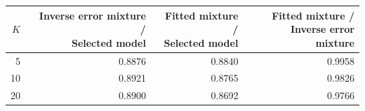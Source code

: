 \begin{tabular}{rrrr}
\toprule
$K$ & \shortstack[r]{Inverse error mixture /\\Selected model} & \shortstack[r]{Fitted mixture /\\Selected model} & \shortstack[r]{Fitted mixture /\\Inverse error mixture} \\
\midrule
5 & 0.8876 & 0.8840 & 0.9958 \\
10 & 0.8921 & 0.8765 & 0.9826 \\
20 & 0.8900 & 0.8692 & 0.9766 \\
\bottomrule
\end{tabular}
